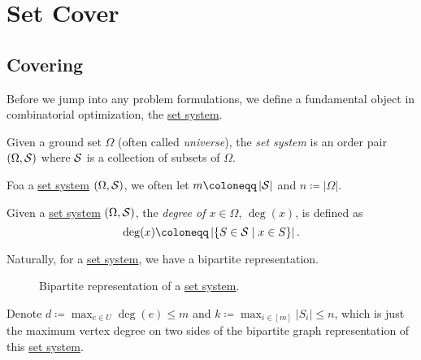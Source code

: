 \chapter{Set Cover}\label{ch:covering}

\section{Covering}

Before we jump into any problem formulations, we define a fundamental object in combinatorial optimization, the \hyperref[def:set-system]{set system}.

\begin{definition}\label{def:set-system}
	Given a ground set \(\Omega\) (often called \emph{universe}), the \emph{set system} is an order pair \((\Omega , \mathcal{\MakeUppercase{S}} )\) where \(\mathcal{\MakeUppercase{S}} \) is a collection of subsets of \(\Omega\).
\end{definition}

\begin{note}
	Foa a \hyperref[def:set-system]{set system} \((\Omega , \mathcal{\MakeUppercase{S}} )\), we often let \(m\coloneqq \left\vert \mathcal{\MakeUppercase{S}}  \right\vert \) and \(n\coloneqq \left\vert \Omega  \right\vert \).
\end{note}

\begin{definition}[Degree]\label{def:degree}
	Given a \hyperref[def:set-system]{set system} \((\Omega , \mathcal{\MakeUppercase{S}} )\), the \emph{degree of \(x\in \Omega\)}, \(\deg(x)\), is defined as
	\[
		\deg(x) \coloneqq \left\vert \left\{ S\in \mathcal{\MakeUppercase{S}} \mid x\in S \right\}  \right\vert.
	\]
\end{definition}

\begin{remark}
	Naturally, for a \hyperref[def:set-system]{set system}, we have a bipartite representation.
	\begin{figure}[H]
		\centering
		\caption{Bipartite representation of a \hyperref[def:set-system]{set system}.}
		\label{fig:set-system-bip}
	\end{figure}

	Denote \(d \coloneqq \max _{e\in U}\deg(e)\leq m\) and \(k \coloneqq \max _{i\in [m]}\left\vert S_i \right\vert \leq n\), which is just the maximum vertex degree on two sides of the bipartite graph representation of this \hyperref[def:set-system]{set system}.
\end{remark}

